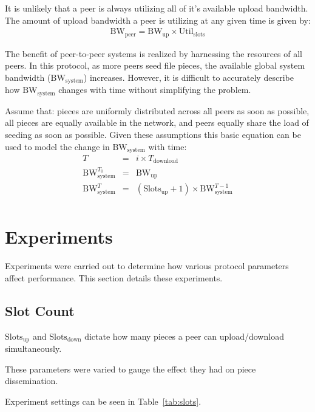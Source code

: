\documentclass[a4paper,12pt,twocolumn]{article}
\newcommand{\tref}[1]{Table~\ref{#1}}
\begin{document}
It is unlikely that a peer is always utilizing all of it's available upload bandwidth. The amount of upload bandwidth a peer is utilizing at any given time is given by:
\begin{eqnarray}
\label{eqn:bandwidth_peer}
  \text{BW}_{\text{peer}}=\text{BW}_{\text{up}} \times \text{Util}_{\text{slots}}
\end{eqnarray}

The benefit of peer-to-peer systems is realized by harnessing the resources of all peers. In this protocol, as more peers seed file pieces, the available global system bandwidth ($\text{BW}_{\text{system}}$) increases. However, it is difficult to accurately describe how $\text{BW}_{\text{system}}$ changes with time without simplifying the problem.

Assume that: pieces are uniformly distributed across all peers as soon as possible, all pieces are equally available in the network, and peers equally share the load of seeding as soon as possible.
Given these assumptions this basic equation can be used to model the change in $\text{BW}_{\text{system}}$ with time:
\begin{eqnarray}
\label{eqn:bandwidth_system}
  T &=& i \times T_{\text{download}}\nonumber \\
  \text{BW}_{\text{system}}^{T_0} &=& \text{BW}_{\text{up}} \nonumber \\
  \text{BW}_{\text{system}}^{T} &=& (\text{Slots}_{\text{up}} + 1) \times \text{BW}_{\text{system}}^{T-1} \nonumber \\
\end{eqnarray}


\section{Experiments}
\label{sec:experiments}
Experiments were carried out to determine how various protocol parameters affect performance. This section details these experiments.

\subsection{Slot Count}
\label{subsec:slots}
$\text{Slots}_{\text{up}}$ and $\text{Slots}_{\text{down}}$ dictate how many pieces a peer can upload/download simultaneously.

These parameters were varied to gauge the effect they had on piece dissemination.

Experiment settings can be seen in \tref{tab:slots}.
\end{document}
